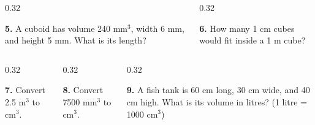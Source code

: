 \documentclass[aspectratio=169,12pt]{beamer}
\newcommand{\MMProblem}[2]{\begin{MMProblemCard}\raggedright\small\textbf{#1.} #2\par\end{MMProblemCard}}
\begin{document}
\begin{frame}[t]
\begin{columns}[T,onlytextwidth]
\begin{column}{0.32\textwidth}\MMProblem{5}{A cuboid has volume 240 mm\mbox{$^3$}, width 6 mm, and height 5 mm. What is its length?}\end{column}
\begin{column}{0.32\textwidth}\MMProblem{6}{How many 1 cm cubes would fit inside a 1 m cube?}\end{column}
\end{columns}
\vspace{0.45em}
\begin{columns}[T,onlytextwidth]
\begin{column}{0.32\textwidth}\MMProblem{7}{Convert 2.5 m\mbox{$^3$} to cm\mbox{$^3$}.}\end{column}
\begin{column}{0.32\textwidth}\MMProblem{8}{Convert 7500 mm\mbox{$^3$} to cm\mbox{$^3$}.}\end{column}
\begin{column}{0.32\textwidth}\MMProblem{9}{A fish tank is 60 cm long, 30 cm wide, and 40 cm high. What is its volume in litres? (1 litre = 1000 cm\mbox{$^3$})}\end{column}
\end{columns}
\end{frame}
\end{document}
